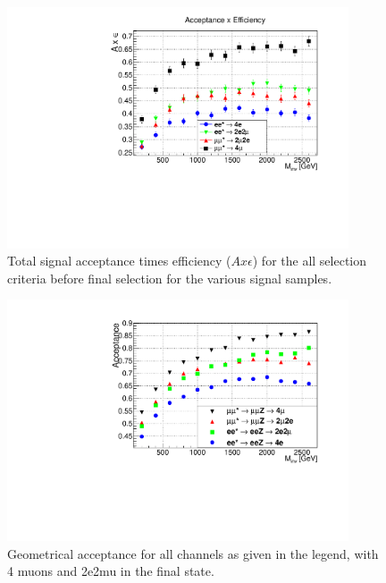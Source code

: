 
\begin{figure}[h!]
\begin{center}
\includegraphics[width=0.9\textwidth]{plot/Effizienz_allchannels.pdf}
\end{center}
\caption{\label{fig:AccxEff}Total signal acceptance times efficiency ($A x \epsilon$) for the all selection criteria before final selection for the various signal samples.}
\end{figure}

\begin{figure}[h!]
\begin{center}
\includegraphics[width=0.9\textwidth]{plot/Acceptance_only.pdf}
\end{center}
\caption{\label{fig:Acc}Geometrical acceptance for all channels as given in the legend, with 4 muons and 2e2mu in the final state.}
\end{figure}

